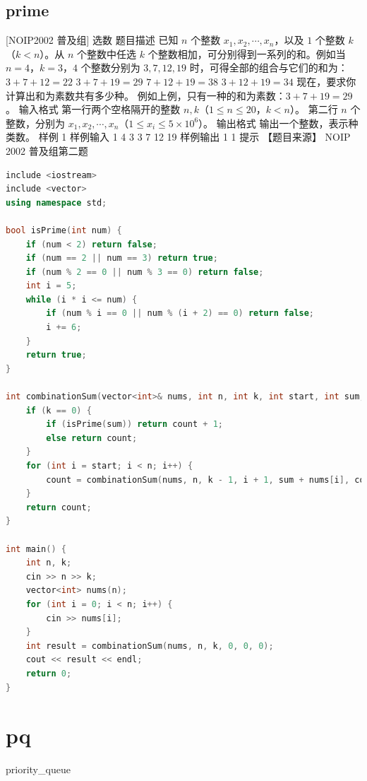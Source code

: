 \documentclass[12pt,twiside,a4paper]{ctexbook}
\numberwithin{chapter}{part}
\begin{document}
\section{prime}
 [NOIP2002 普及组] 选数
 题目描述
已知 $n$ 个整数 $x_1,x_2,\cdots,x_n$，以及 $1$ 个整数 $k$（$k<n$）。从 $n$ 个整数中任选 $k$ 个整数相加，可分别得到一系列的和。例如当 $n=4$，$k=3$，$4$ 个整数分别为 $3,7,12,19$ 时，可得全部的组合与它们的和为：
$3+7+12=22$
$3+7+19=29$
$7+12+19=38$
$3+12+19=34$
现在，要求你计算出和为素数共有多少种。
例如上例，只有一种的和为素数：$3+7+19=29$。
 输入格式
第一行两个空格隔开的整数 $n,k$（$1 \le n \le 20$，$k<n$）。
第二行 $n$ 个整数，分别为 $x_1,x_2,\cdots,x_n$（$1 \le x_i \le 5\times 10^6$）。
 输出格式
输出一个整数，表示种类数。
 样例 1
 样例输入 1
4 3
3 7 12 19
 样例输出 1
1
 提示
【题目来源】
NOIP 2002 普及组第二题
\begin{lstlisting}[language=c++,breaklines=true]
include <iostream>
include <vector>
using namespace std;

bool isPrime(int num) {
    if (num < 2) return false;
    if (num == 2 || num == 3) return true;
    if (num % 2 == 0 || num % 3 == 0) return false;
    int i = 5;
    while (i * i <= num) {
        if (num % i == 0 || num % (i + 2) == 0) return false;
        i += 6;
    }
    return true;
}

int combinationSum(vector<int>& nums, int n, int k, int start, int sum, int count) {
    if (k == 0) {
        if (isPrime(sum)) return count + 1;
        else return count;
    }
    for (int i = start; i < n; i++) {
        count = combinationSum(nums, n, k - 1, i + 1, sum + nums[i], count);
    }
    return count;
}

int main() {
    int n, k;
    cin >> n >> k;
    vector<int> nums(n);
    for (int i = 0; i < n; i++) {
        cin >> nums[i];
    }
    int result = combinationSum(nums, n, k, 0, 0, 0);
    cout << result << endl;
    return 0;
}
\end{lstlisting}

\chapter{pq}
priority\_queue
\end{document}
